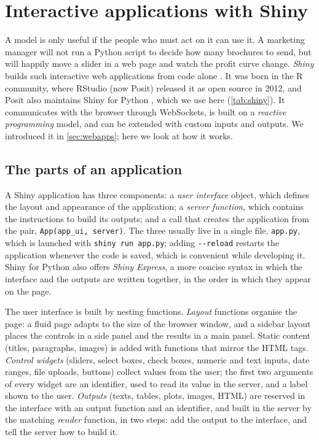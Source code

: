 \section{Interactive applications with Shiny}\label{sec:shinyapps}

A model is only useful if the people who must act on it can use it. A marketing manager will not run a Python script to
decide how many brochures to send, but will happily move a slider in a web page and watch the profit curve change.
\emph{Shiny} builds such interactive web applications from code alone \citep{shiny2012,wickham2021mastering}. It was born in the
R community, where RStudio (now Posit) released it as open source in 2012, and Posit also maintains Shiny for Python
\citep{shinypython2024}, which we use here (\cref{tab:shiny}). It communicates with the browser through WebSockets, is built on
a \emph{reactive programming} model, and can be extended with custom inputs and outputs. We introduced it in
\cref{sec:webapps}; here we look at how it works.

\subsection{The parts of an application}

A Shiny application has three components: a \emph{user interface} object, which defines the layout and appearance of the
application; a \emph{server function}, which contains the instructions to build its outputs; and a call that creates the
application from the pair, \texttt{App(app\_ui, server)}. The three usually live in a single file, \texttt{app.py}, which is
launched with \texttt{shiny run app.py}; adding \texttt{-{}-reload} restarts the application whenever the code is saved, which is
convenient while developing it. Shiny for Python also offers \emph{Shiny Express}, a more concise syntax in which the interface and
the outputs are written together, in the order in which they appear on the page.

The user interface is built by nesting functions. \emph{Layout} functions organise the page: a fluid page adapts to the size
of the browser window, and a sidebar layout places the controls in a side panel and the results in a main panel. Static
content (titles, paragraphs, images) is added with functions that mirror the HTML tags. \emph{Control widgets} (sliders, select
boxes, check boxes, numeric and text inputs, date ranges, file uploads, buttons) collect values from the user; the first
two arguments of every widget are an identifier, used to read its value in the server, and a label shown to the user.
\emph{Outputs} (texts, tables, plots, images, HTML) are reserved in the interface with an output function and an identifier,
and built in the server by the matching \emph{render} function, in two steps: add the output to the interface, and tell the
server how to build it.

